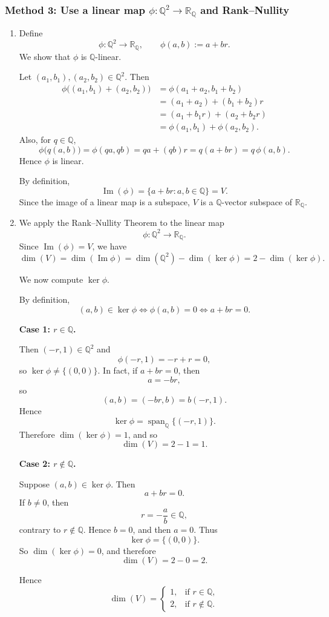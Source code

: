\documentclass[12pt]{article}
\newcommand{\Q}{\mathbb{Q}}
\newcommand{\R}{\mathbb{R}}
\newcommand{\dimn}{\operatorname{dim}}
\begin{document}
\subsubsection{Method 3: Use a linear map \(\phi:\Q^2\to \R_{\Q}\) and Rank--Nullity}
\begin{enumerate}[label=(\alph*)]
\item Define
\[
\phi:\Q^2\to \R_{\Q},
\qquad
\phi(a,b):=a+br.
\]
We show that \(\phi\) is \(\Q\)-linear.

Let \((a_1,b_1),(a_2,b_2)\in\Q^2\). Then
\begin{align*}
\phi\bigl((a_1,b_1)+(a_2,b_2)\bigr)
&=\phi(a_1+a_2,b_1+b_2)\\
&=(a_1+a_2)+(b_1+b_2)r\\
&=(a_1+b_1r)+(a_2+b_2r)\\
&=\phi(a_1,b_1)+\phi(a_2,b_2).
\end{align*}
Also, for \(q\in\Q\),
\[
\phi\bigl(q(a,b)\bigr)=\phi(qa,qb)=qa+(qb)r=q(a+br)=q\,\phi(a,b).
\]
Hence \(\phi\) is linear.

By definition,
\[
\operatorname{Im}(\phi)=\{a+br:a,b\in\Q\}=V.
\]
Since the image of a linear map is a subspace, \(V\) is a \(\Q\)-vector subspace of \(\R_{\Q}\).

\item We apply the Rank--Nullity Theorem to the linear map
\[
\phi:\Q^2\to \R_{\Q}.
\]
Since \(\operatorname{Im}(\phi)=V\), we have
\[
\dimn(V)=\dimn(\operatorname{Im}\phi)
=\dimn(\Q^2)-\dimn(\ker\phi)
=2-\dimn(\ker\phi).
\]

We now compute \(\ker\phi\).

By definition,
\[
(a,b)\in\ker\phi
\iff \phi(a,b)=0
\iff a+br=0.
\]

\textbf{Case 1: \(r\in\Q\).}

Then \(( -r,1)\in\Q^2\) and
\[
\phi(-r,1)=-r+r=0,
\]
so \(\ker\phi\neq \{(0,0)\}\). In fact, if \(a+br=0\), then
\[
a=-br,
\]
so
\[
(a,b)=(-br,b)=b(-r,1).
\]
Hence
\[
\ker\phi=\operatorname{span}_{\Q}\{(-r,1)\}.
\]
Therefore \(\dimn(\ker\phi)=1\), and so
\[
\dimn(V)=2-1=1.
\]

\textbf{Case 2: \(r\notin\Q\).}

Suppose \((a,b)\in\ker\phi\). Then
\[
a+br=0.
\]
If \(b\neq 0\), then
\[
r=-\frac{a}{b}\in\Q,
\]
contrary to \(r\notin\Q\). Hence \(b=0\), and then \(a=0\). Thus
\[
\ker\phi=\{(0,0)\}.
\]
So \(\dimn(\ker\phi)=0\), and therefore
\[
\dimn(V)=2-0=2.
\]

Hence
\[
\boxed{
\dimn(V)=
\begin{cases}
1, & \text{if } r\in\Q,\\[1mm]
2, & \text{if } r\notin\Q.
\end{cases}}
\]
\end{enumerate}
\end{document}
